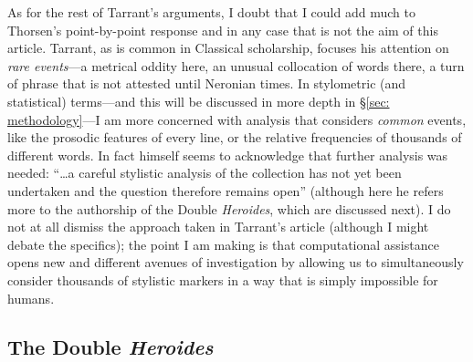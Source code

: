\documentclass[twocolumn, switch, a4paper]{article} %
\begin{document}
As for the rest of Tarrant's arguments, I doubt that I could add much to
Thorsen's \citeyear[105 ff.]{thorsen_ovearly} point-by-point response and in
any case that is not the aim of this article. Tarrant, as is common in
Classical scholarship, focuses his attention on \emph{rare events}---a
metrical oddity here, an unusual collocation of words there, a turn of phrase
that is not attested until Neronian times. In stylometric (and statistical)
terms---and this will be discussed in more depth in \S \ref{sec:
methodology}---I am more concerned with analysis that considers \emph{common}
events, like the prosodic features of every line, or the relative frequencies
of thousands of different words. In fact  himself
seems to acknowledge that further analysis was needed: ``\dots a careful
stylistic analysis of the collection has not yet been undertaken and the
question therefore remains open'' (although here he refers more to the
authorship of the Double \emph{Heroides}, which are discussed next). I do not
at all dismiss the approach taken in Tarrant's article (although I might
debate the specifics); the point I am making is that computational assistance
opens new and different avenues of investigation by allowing us to
simultaneously consider thousands of stylistic markers in a way that is simply
impossible for humans.

\subsection{The Double \emph{Heroides}}
\end{document}
